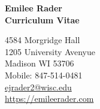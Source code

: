 \documentclass[9pt]{extarticle}
\begin{document}
{\LARGE{\textbf{Emilee Rader}}}  \\ \vspace{3pt}
\textbf{Curriculum Vitae}


\begin{tabbing}
4584 Morgridge Hall \\
1205 University Avenyue \\
Madison WI 53706 \\
Mobile: 847-514-0481 \\
\href{mailto:ejrader2@wisc.edu}{ejrader2@wisc.edu} \\
\href{https://emileerader.com/}{https://emileerader.com}  \\\\\\
\end{tabbing}



\end{document}
